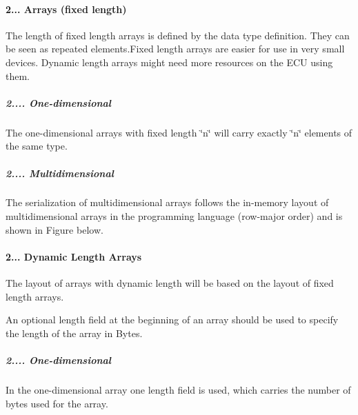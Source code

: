 \paragraph*{2... Arrays (fixed length)}


\begin{DoxyItemize}
\item The length of fixed length arrays is defined by the data type definition. They can be seen as repeated elements.\+Fixed length arrays are easier for use in very small devices. Dynamic length arrays might need more resources on the E\+CU using them.
\end{DoxyItemize}

\subparagraph*{2.... One-\/dimensional}


\begin{DoxyItemize}
\item The one-\/dimensional arrays with fixed length \char`\"{}n\char`\"{} will carry exactly \char`\"{}n\char`\"{} elements of the same type. 
\end{DoxyItemize}

\subparagraph*{2.... Multidimensional}


\begin{DoxyItemize}
\item The serialization of multidimensional arrays follows the in-\/memory layout of multidimensional arrays in the programming language (row-\/major order) and is shown in Figure below. 
\end{DoxyItemize}

\paragraph*{2... Dynamic Length Arrays}


\begin{DoxyItemize}
\item The layout of arrays with dynamic length will be based on the layout of fixed length arrays.
\item An optional length field at the beginning of an array should be used to specify the length of the array in Bytes.
\end{DoxyItemize}

\subparagraph*{2.... One-\/dimensional}


\begin{DoxyItemize}
\item In the one-\/dimensional array one length field is used, which carries the number of bytes used for the array.
\end{DoxyItemize}


